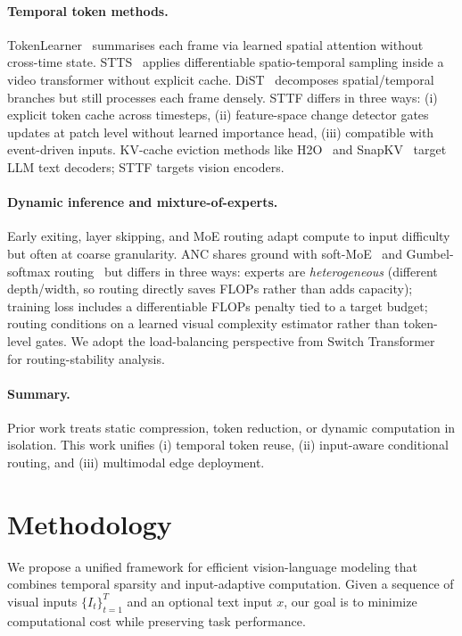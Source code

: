 \documentclass{article}
\begin{document}
\paragraph{Temporal token methods.}
TokenLearner~\cite{ryoo2021tokenlearner} summarises each frame via learned spatial attention without cross-time state. STTS~\cite{wang2022stts} applies differentiable spatio-temporal sampling inside a video transformer without explicit cache. DiST~\cite{qing2023dist} decomposes spatial/temporal branches but still processes each frame densely. STTF differs in three ways: (i) explicit token cache across timesteps, (ii) feature-space change detector gates updates at patch level without learned importance head, (iii) compatible with event-driven inputs. KV-cache eviction methods like H2O~\cite{zhang2023h2o} and SnapKV~\cite{li2024snapkv} target LLM text decoders; STTF targets vision encoders.

\paragraph{Dynamic inference and mixture-of-experts.}
Early exiting, layer skipping, and MoE routing adapt compute to input difficulty but often at coarse granularity. ANC shares ground with soft-MoE~\cite{shazeer2017moe, puigcerver2024softmoe} and Gumbel-softmax routing~\cite{jang2017gumbel} but differs in three ways: experts are \emph{heterogeneous} (different depth/width, so routing directly saves FLOPs rather than adds capacity); training loss includes a differentiable FLOPs penalty tied to a target budget; routing conditions on a learned visual complexity estimator rather than token-level gates. We adopt the load-balancing perspective from Switch Transformer~\cite{fedus2022switch} for routing-stability analysis.

\paragraph{Summary.}
Prior work treats static compression, token reduction, or dynamic computation in isolation. This work unifies (i) temporal token reuse, (ii) input-aware conditional routing, and (iii) multimodal edge deployment.

\section{Methodology}

We propose a unified framework for efficient vision-language modeling that combines temporal sparsity and input-adaptive computation. Given a sequence of visual inputs $\{I_t\}_{t=1}^{T}$ and an optional text input $x$, our goal is to minimize computational cost while preserving task performance.
\end{document}
